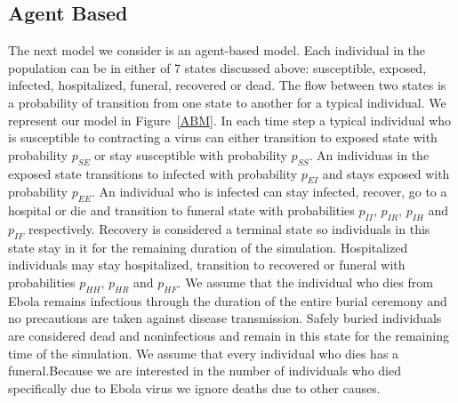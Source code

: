\documentclass[10pt]{article}
\begin{document}
\subsection{Agent Based} 
The next model we consider is an agent-based model. Each individual in the population can be in either of 7 states discussed above: susceptible, exposed, infected, hospitalized, funeral, recovered or dead. The flow between two states is a  probability of transition from one state to another for a typical individual. We represent our model in Figure~\ref{ABM}. In each time step a typical individual who is susceptible to contracting a virus can either transition to exposed state with probability $p_{SE}$ or stay susceptible with probability $p_{SS}$. An individuas in the exposed state transitions to infected with probability $p_{EI}$ and stays exposed with probability $p_{EE}$. An individual who is infected can stay infected, recover, go to a hospital or die and transition to funeral state with probabilities $p_{II},\, p_{IR},\, p_{IH}$ and $p_{IF}$ respectively. Recovery is considered a terminal state so individuals in this state stay in it for the remaining duration of the simulation. Hospitalized individuals may stay hospitalized, transition to recovered or funeral with probabilities $p_{HH}, \, p_{HR}$ and $p_{HF}$. We assume that the individual who dies from Ebola remains infectious through the duration of the entire burial ceremony and no precautions are taken against disease transmission. Safely buried individuals are considered dead and noninfectious and remain in this state for the remaining time of the simulation. We assume that every individual who dies has a funeral.Because we are interested in the number of individuals who died specifically due to Ebola virus we ignore deaths due to other causes.  
\end{document}
